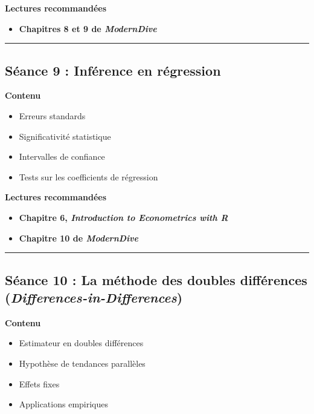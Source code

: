 \documentclass[
  11pt,
]{article}
\providecommand{\tightlist}{%
  \setlength{\itemsep}{0pt}\setlength{\parskip}{0pt}}
\begin{document}
\textbf{Lectures recommandées}

\begin{itemize}
\tightlist
\item
  \textbf{Chapitres 8 et 9 de \emph{ModernDive}}
\end{itemize}

\begin{center}\rule{0.5\linewidth}{0.5pt}\end{center}

\subsection{Séance 9 : Inférence en
régression}\label{suxe9ance-9-infuxe9rence-en-ruxe9gression}

\textbf{Contenu}

\begin{itemize}
\tightlist
\item
  Erreurs standards
\item
  Significativité statistique
\item
  Intervalles de confiance
\item
  Tests sur les coefficients de régression
\end{itemize}

\textbf{Lectures recommandées}

\begin{itemize}
\tightlist
\item
  \textbf{Chapitre 6, \emph{Introduction to Econometrics with R}}
\item
  \textbf{Chapitre 10 de \emph{ModernDive}}
\end{itemize}

\begin{center}\rule{0.5\linewidth}{0.5pt}\end{center}

\subsection{\texorpdfstring{Séance 10 : La méthode des doubles
différences
(\emph{Differences-in-Differences})}{Séance 10 : La méthode des doubles différences (Differences-in-Differences)}}\label{suxe9ance-10-la-muxe9thode-des-doubles-diffuxe9rences-differences-in-differences}

\textbf{Contenu}

\begin{itemize}
\tightlist
\item
  Estimateur en doubles différences
\item
  Hypothèse de tendances parallèles
\item
  Effets fixes
\item
  Applications empiriques
\end{itemize}
\end{document}

